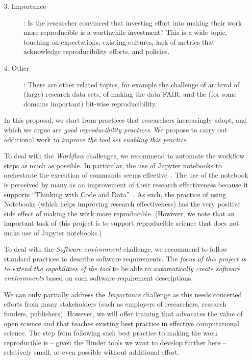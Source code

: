\begin{description}
\item[3. Importance]: Is the researcher convinced that investing effort into making
their work more reproducible is a worthwhile investment? This is a wide topic,
touching on expectations, existing cultures, lack of metrics that acknowledge
reproducibility efforts, and policies.

\item[4. Other]: There are other related topics, for example the challenge of
archival of (large) research data sets, of making the data FAIR, and the (for
some domains important) bit-wise reproducibility.
\end{description}

In this proposal, we start from practices that researchers increasingly adopt,
and which we argue are \emph{good reproducibility practices}. We propose to carry
out additional work to \emph{improve the tool set enabling this practice}.

To deal with the \emph{Workflow} challenges, we recommend to automate the
workflow steps as much as possible. In particular, the use of Jupyter notebooks
to orchestrate the execution of commands seems effective~\cite{Beg2021}.
The use of the notebook is
perceived by many as an improvement of their research effectiveness because
it supports ``Thinking with Code and Data''~\cite{Granger2021}. As such, the
practice of using Notebooks (which helps improving research effectiveness) has
the very positive side effect of making the work more reproducible. (However, we
note that an important task of this project is to support reproducible science
that does not make use of Jupyter notebooks.)

To deal with the \emph{Software environment} challenge, we recommend to follow
standard practices to describe software requirements. The \emph{focus of this
project is to extend the capabilities of the \repotodocker{} tool} to be able to
\emph{automatically create software environments} based on such software
requirement descriptions.

We can only partially address the \emph{Importance} challenge as this needs
concerted efforts from many stakeholders (such as employers of researchers,
research funders, publishers). However, we will offer training that advocates
the value of open science and that teaches existing best practice in
effective computational science. The step from following such best practice to
making the work reproducible is -- given the Binder tools we want to develop
further here -- relatively small, or even possible without additional effort.

